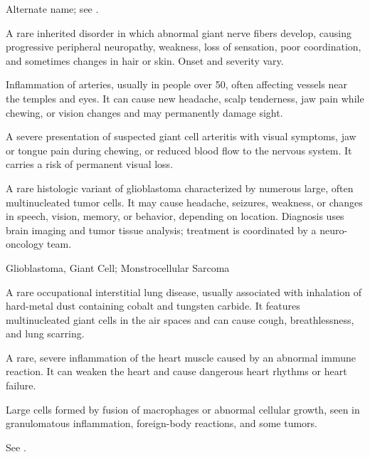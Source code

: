  Alternate name; see .

 A rare inherited disorder in which abnormal giant nerve fibers develop, causing progressive peripheral neuropathy, weakness, loss of sensation, poor coordination, and sometimes changes in hair or skin. Onset and severity vary.

 Inflammation of arteries, usually in people over 50, often affecting vessels near the temples and eyes. It can cause new headache, scalp tenderness, jaw pain while chewing, or vision changes and may permanently damage sight.

 A severe presentation of suspected giant cell arteritis with visual symptoms, jaw or tongue pain during chewing, or reduced blood flow to the nervous system. It carries a risk of permanent visual loss.

 A rare histologic variant of glioblastoma characterized by numerous large, often multinucleated tumor cells. It may cause headache, seizures, weakness, or changes in speech, vision, memory, or behavior, depending on location. Diagnosis uses brain imaging and tumor tissue analysis; treatment is coordinated by a neuro-oncology team.

\synonyms
Glioblastoma, Giant Cell; Monstrocellular Sarcoma

 A rare occupational interstitial lung disease, usually associated with inhalation of hard-metal dust containing cobalt and tungsten carbide. It features multinucleated giant cells in the air spaces and can cause cough, breathlessness, and lung scarring.

 A rare, severe inflammation of the heart muscle caused by an abnormal immune reaction. It can weaken the heart and cause dangerous heart rhythms or heart failure.

 Large cells formed by fusion of macrophages or abnormal cellular growth, seen in granulomatous inflammation, foreign-body reactions, and some tumors.

 See .


